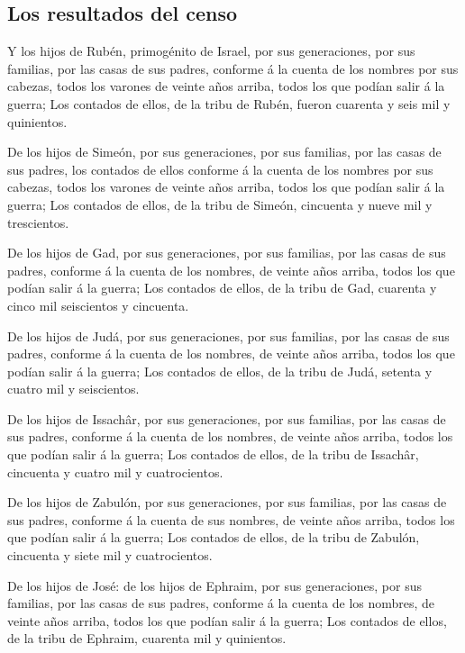 \hypertarget{los-resultados-del-censo}{%
\subsection{Los resultados del censo}\label{los-resultados-del-censo}}

 Y los hijos de Rubén, primogénito de Israel, por sus
generaciones, por sus familias, por las casas de sus padres, conforme á
la cuenta de los nombres por sus cabezas, todos los varones de veinte
años arriba, todos los que podían salir á la guerra;  Los
contados de ellos, de la tribu de Rubén, fueron cuarenta y seis mil y
quinientos.

 De los hijos de Simeón, por sus generaciones, por sus
familias, por las casas de sus padres, los contados de ellos conforme á
la cuenta de los nombres por sus cabezas, todos los varones de veinte
años arriba, todos los que podían salir á la guerra;  Los
contados de ellos, de la tribu de Simeón, cincuenta y nueve mil y
trescientos.

 De los hijos de Gad, por sus generaciones, por sus
familias, por las casas de sus padres, conforme á la cuenta de los
nombres, de veinte años arriba, todos los que podían salir á la guerra;
 Los contados de ellos, de la tribu de Gad, cuarenta y
cinco mil seiscientos y cincuenta.

 De los hijos de Judá, por sus generaciones, por sus
familias, por las casas de sus padres, conforme á la cuenta de los
nombres, de veinte años arriba, todos los que podían salir á la guerra;
 Los contados de ellos, de la tribu de Judá, setenta y
cuatro mil y seiscientos.

 De los hijos de Issachâr, por sus generaciones, por sus
familias, por las casas de sus padres, conforme á la cuenta de los
nombres, de veinte años arriba, todos los que podían salir á la guerra;
 Los contados de ellos, de la tribu de Issachâr,
cincuenta y cuatro mil y cuatrocientos.

 De los hijos de Zabulón, por sus generaciones, por sus
familias, por las casas de sus padres, conforme á la cuenta de sus
nombres, de veinte años arriba, todos los que podían salir á la guerra;
 Los contados de ellos, de la tribu de Zabulón, cincuenta
y siete mil y cuatrocientos.

 De los hijos de José: de los hijos de Ephraim, por sus
generaciones, por sus familias, por las casas de sus padres, conforme á
la cuenta de los nombres, de veinte años arriba, todos los que podían
salir á la guerra;  Los contados de ellos, de la tribu de
Ephraim, cuarenta mil y quinientos.

